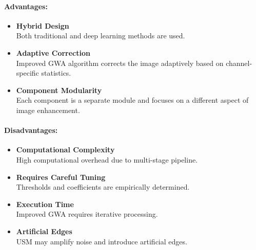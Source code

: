 \paragraph{Advantages:}
\begin{itemize}
      \item \textbf{Hybrid Design} \\
            Both traditional and deep learning methods are used.

      \item \textbf{Adaptive Correction} \\
            Improved GWA algorithm corrects the image adaptively based on channel-specific statistics.

      \item \textbf{Component Modularity} \\
            Each component is a separate module and focuses on a different aspect of image enhancement.
\end{itemize}

\paragraph{Disadvantages:}

\begin{itemize}
      \item \textbf{Computational Complexity} \\
            High computational overhead due to multi-stage pipeline.

      \item \textbf{Requires Careful Tuning} \\
            Thresholds and coefficients are empirically determined.

      \item \textbf{Execution Time} \\
            Improved GWA requires iterative processing.

      \item \textbf{Artificial Edges} \\
            USM may amplify noise and introduce artificial edges.
\end{itemize}